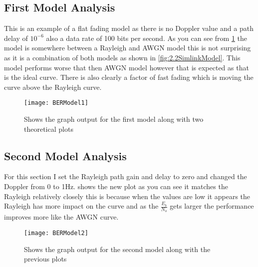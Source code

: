 {	\subsection{First Model Analysis}
	{
		This is an example of a flat fading model as there is no Doppler value and a path delay of $10^{-6}$ also a data rate of 100 bits per second. As you can see from \cref{fig:BERModel1} the model is somewhere between a Rayleigh and AWGN model this is not surprising as it is a combination of both models as shown in \cref{fig:2.2SimlinkModel}. This model performs worse that then AWGN model however that is expected as that is the ideal curve. There is also clearly a factor of fast fading which is moving the curve above the Rayleigh curve.
   		\begin{figure}
			\centering
			\texttt{[image: BERModel1]}
			\caption{Shows the graph output for the first model along with two theoretical plots}
			\label{fig:BERModel1}
		\end{figure}
	}
	\subsection{Second Model Analysis}
	{
		For this section I set the Rayleigh path gain and delay to zero and changed the Doppler from 0 to 1Hz.  shows the new plot as you can see it matches the Rayleigh relatively closely this is because when the values are low it appears the Rayleigh has more impact on the curve and as the $\frac{E_b}{N_o}$ gets larger the performance improves more like the AWGN curve.
   		\begin{figure}
			\centering
			\texttt{[image: BERModel2]}
			\caption{Shows the graph output for the second model along with the previous plots}
			\label{fig:BERModel2}
		\end{figure}
	}

}